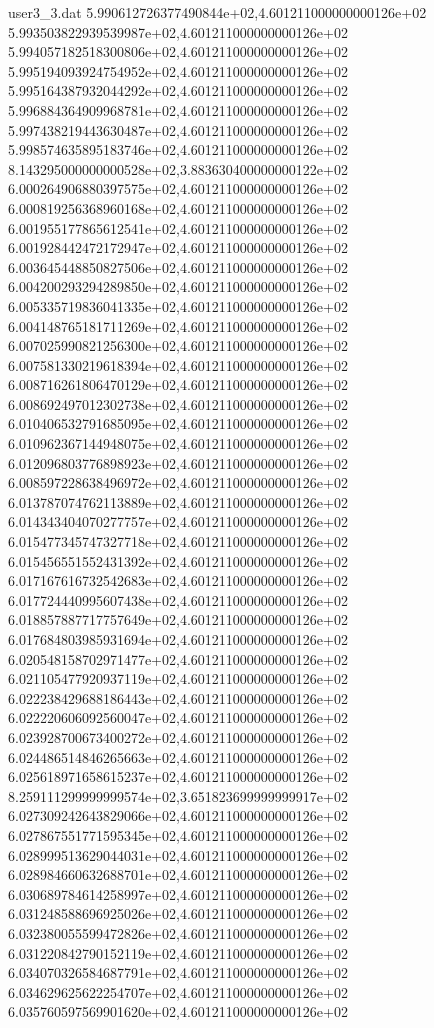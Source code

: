 \begin{filecontents}{user3_3.dat}
5.990612726377490844e+02,4.601211000000000126e+02
5.993503822939539987e+02,4.601211000000000126e+02
5.994057182518300806e+02,4.601211000000000126e+02
5.995194093924754952e+02,4.601211000000000126e+02
5.995164387932044292e+02,4.601211000000000126e+02
5.996884364909968781e+02,4.601211000000000126e+02
5.997438219443630487e+02,4.601211000000000126e+02
5.998574635895183746e+02,4.601211000000000126e+02
8.143295000000000528e+02,3.883630400000000122e+02
6.000264906880397575e+02,4.601211000000000126e+02
6.000819256368960168e+02,4.601211000000000126e+02
6.001955177865612541e+02,4.601211000000000126e+02
6.001928442472172947e+02,4.601211000000000126e+02
6.003645448850827506e+02,4.601211000000000126e+02
6.004200293294289850e+02,4.601211000000000126e+02
6.005335719836041335e+02,4.601211000000000126e+02
6.004148765181711269e+02,4.601211000000000126e+02
6.007025990821256300e+02,4.601211000000000126e+02
6.007581330219618394e+02,4.601211000000000126e+02
6.008716261806470129e+02,4.601211000000000126e+02
6.008692497012302738e+02,4.601211000000000126e+02
6.010406532791685095e+02,4.601211000000000126e+02
6.010962367144948075e+02,4.601211000000000126e+02
6.012096803776898923e+02,4.601211000000000126e+02
6.008597228638496972e+02,4.601211000000000126e+02
6.013787074762113889e+02,4.601211000000000126e+02
6.014343404070277757e+02,4.601211000000000126e+02
6.015477345747327718e+02,4.601211000000000126e+02
6.015456551552431392e+02,4.601211000000000126e+02
6.017167616732542683e+02,4.601211000000000126e+02
6.017724440995607438e+02,4.601211000000000126e+02
6.018857887717757649e+02,4.601211000000000126e+02
6.017684803985931694e+02,4.601211000000000126e+02
6.020548158702971477e+02,4.601211000000000126e+02
6.021105477920937119e+02,4.601211000000000126e+02
6.022238429688186443e+02,4.601211000000000126e+02
6.022220606092560047e+02,4.601211000000000126e+02
6.023928700673400272e+02,4.601211000000000126e+02
6.024486514846265663e+02,4.601211000000000126e+02
6.025618971658615237e+02,4.601211000000000126e+02
8.259111299999999574e+02,3.651823699999999917e+02
6.027309242643829066e+02,4.601211000000000126e+02
6.027867551771595345e+02,4.601211000000000126e+02
6.028999513629044031e+02,4.601211000000000126e+02
6.028984660632688701e+02,4.601211000000000126e+02
6.030689784614258997e+02,4.601211000000000126e+02
6.031248588696925026e+02,4.601211000000000126e+02
6.032380055599472826e+02,4.601211000000000126e+02
6.031220842790152119e+02,4.601211000000000126e+02
6.034070326584687791e+02,4.601211000000000126e+02
6.034629625622254707e+02,4.601211000000000126e+02
6.035760597569901620e+02,4.601211000000000126e+02

\end{filecontents}
